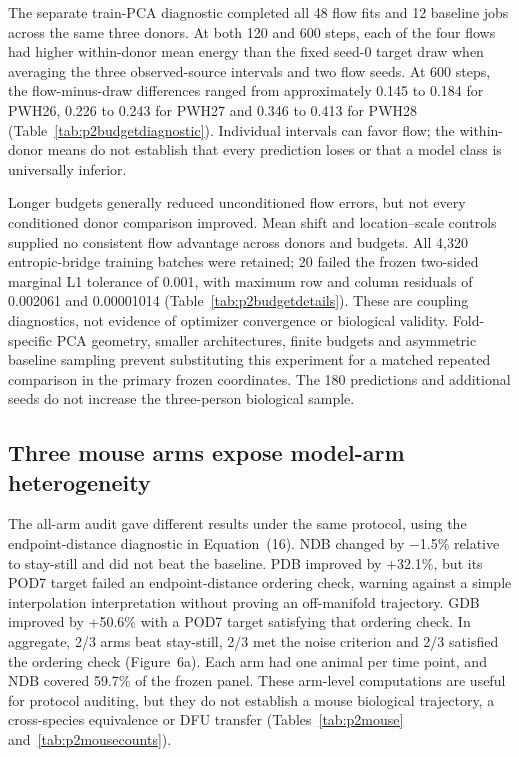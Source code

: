 \documentclass[10pt,a4paper]{article}
\begin{document}
The separate train-PCA diagnostic completed all 48 flow fits and 12 baseline jobs across the same three donors. At both 120 and 600 steps, each of the four flows had higher within-donor mean energy than the fixed seed-0 target draw when averaging the three observed-source intervals and two flow seeds. At 600 steps, the flow-minus-draw differences ranged from approximately 0.145 to 0.184 for PWH26, 0.226 to 0.243 for PWH27 and 0.346 to 0.413 for PWH28 (Table~\ref{tab:p2budgetdiagnostic}). Individual intervals can favor flow; the within-donor means do not establish that every prediction loses or that a model class is universally inferior.

Longer budgets generally reduced unconditioned flow errors, but not every conditioned donor comparison improved. Mean shift and location--scale controls supplied no consistent flow advantage across donors and budgets. All 4,320 entropic-bridge training batches were retained; 20 failed the frozen two-sided marginal L1 tolerance of 0.001, with maximum row and column residuals of 0.002061 and 0.00001014 (Table~\ref{tab:p2budgetdetails}). These are coupling diagnostics, not evidence of optimizer convergence or biological validity. Fold-specific PCA geometry, smaller architectures, finite budgets and asymmetric baseline sampling prevent substituting this experiment for a matched repeated comparison in the primary frozen coordinates. The 180 predictions and additional seeds do not increase the three-person biological sample.

\subsection{Three mouse arms expose model-arm heterogeneity}

The all-arm audit gave different results under the same protocol, using the endpoint-distance diagnostic in Equation~(16). NDB changed by −1.5\% relative to stay-still and did not beat the baseline. PDB improved by +32.1\%, but its POD7 target failed an endpoint-distance ordering check, warning against a simple interpolation interpretation without proving an off-manifold trajectory. GDB improved by +50.6\% with a POD7 target satisfying that ordering check. In aggregate, 2/3 arms beat stay-still, 2/3 met the noise criterion and 2/3 satisfied the ordering check (Figure~6a\label{call:p2f7}). Each arm had one animal per time point, and NDB covered 59.7\% of the frozen panel. These arm-level computations are useful for protocol auditing, but they do not establish a mouse biological trajectory, a cross-species equivalence or DFU transfer (Tables~\ref{tab:p2mouse} and~\ref{tab:p2mousecounts}).
\end{document}

